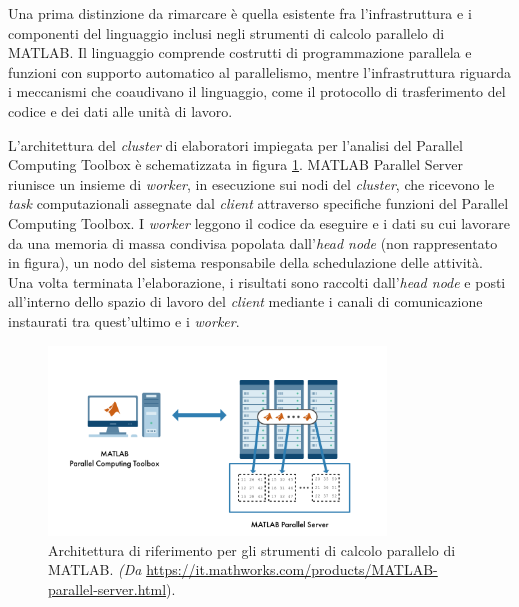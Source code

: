 Una prima distinzione da rimarcare \`e quella esistente fra l'infrastruttura e i componenti del linguaggio inclusi negli strumenti di calcolo parallelo di MATLAB.\newline
Il linguaggio comprende costrutti di programmazione parallela e funzioni con supporto automatico al parallelismo, mentre l'infrastruttura riguarda i meccanismi che coaudivano il linguaggio, come il protocollo di trasferimento del codice e dei dati alle unit\`a di lavoro.

L'architettura del \textit{cluster} di elaboratori impiegata per l'analisi del Parallel Computing Toolbox \`e schematizzata in figura \ref{fig:architetturaRiferimento}.\newline
MATLAB Parallel Server riunisce un insieme di \textit{worker}, in esecuzione sui nodi del \textit{cluster}, che ricevono le
\textit{task} computazionali assegnate dal \textit{client} attraverso specifiche funzioni del Parallel Computing Toolbox. \newline
I \textit{worker} leggono il codice da eseguire e i dati su cui lavorare da una memoria di massa condivisa popolata dall'\textit{head node}
(non rappresentato in figura), un nodo del sistema responsabile della schedulazione delle attivit\`a.\newline
Una volta terminata l'elaborazione, i risultati sono raccolti dall'\textit{head node} e posti all'interno dello spazio di lavoro del \textit{client}
mediante i canali di comunicazione instaurati tra quest'ultimo e i \textit{worker}.

\begin{figure}[htbp]
    \centering
    \includegraphics[width=0.8\textwidth]{../Risorse/Capitolo 2/ReferenceArchitecture.png}
    \caption{Architettura di riferimento per gli strumenti di calcolo parallelo di MATLAB.
        \small{\textit{(Da} \url{https://it.mathworks.com/products/MATLAB-parallel-server.html})}.}
    \label{fig:architetturaRiferimento}
\end{figure}

